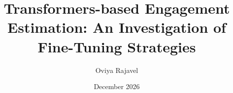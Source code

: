 \documentclass[thesis]{mas_report}
\author{Oviya Rajavel}
\title{Transformers-based Engagement Estimation:  An Investigation of Fine-Tuning Strategies}
\date{December 2026}
\begin{document}
\frontmatter

\begin{titlepage}
    \maketitle
\end{titlepage}

\cleardoublepage
{}

\pagestyle{plain}
\cleardoublepage
\statementpage




\tableofcontents


\mainmatter %

\pagestyle{mainmatter}








\begin{appendices}
    
\end{appendices}

\backmatter

% 

\end{document}
